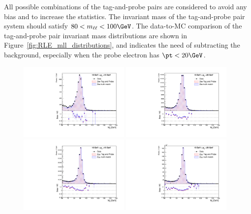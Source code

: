 All possible combinations of the tag-and-probe pairs are considered to avoid any bias and to increase the statistics.
The invariant mass of the tag-and-probe pair system should satisfy $80<m_{\ell\ell}<100 \GeV$.
The data-to-MC comparison of the tag-and-probe pair invariant mass distributions are shown in Figure~\ref{fig:RLE_mll_distributions}, and indicates the need of subtracting the background, especially when the probe electron has $\pt<20 \GeV$.

\begin{figure}[htbp]
\includegraphics[width=0.48\textwidth]{signal_level_Mee_pt1015_ratio_plot_MC_normalized}
\includegraphics[width=0.48\textwidth]{signal_level_Mee_pt1520_ratio_plot_MC_normalized}\\
\includegraphics[width=0.48\textwidth]{signal_level_Mmumu_pt1015_ratio_plot_MC_normalized}
\includegraphics[width=0.48\textwidth]{signal_level_Mmumu_pt1520_ratio_plot_MC_normalized}

\end{figure}
